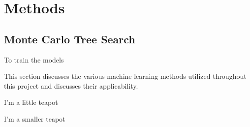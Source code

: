 \chapter{Methods}

\section{Monte Carlo Tree Search}

To train the models  


This section discusses the various machine learning methods utilized throughout this project 
and discusses their applicability.


I'm a little teapot


I'm a smaller teapot
